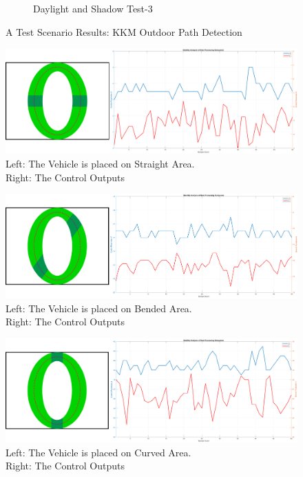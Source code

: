 \documentclass[a4paper,12pt]{article}
\begin{document}
\begin{figure}[H]
\begin{subfigure}{.31\textwidth}
\caption{\label{fig:dataP_outsideObs2} Daylight and Shadow Test-3}

\end{subfigure}

\caption{\label{fig:dataP_outside} A Test Scenario Results: KKM Outdoor Path Detection}

\end{figure}

\begin{figure}[h!]
	\includegraphics[width=.95\textwidth,center]{images/stabilityTestI}
	\caption{ Left: The Vehicle is placed on Straight Area.\\ Right: The Control Outputs \label{fig:stabilityTestI-dist} }
\end{figure}		

\begin{figure}[h!]
	
	\includegraphics[width=.95\textwidth,center]{images/stabilityTestS}
	
	\caption{ Left: The Vehicle is placed on Bended Area.\\ Right: The Control Outputs \label{fig:stabilityTestS-dist} }
	
\end{figure}	
\begin{figure}[h!]
	
	\includegraphics[width=.95\textwidth,center]{images/stabilityTestU}
	
	\caption{ Left: The Vehicle is placed on Curved Area.\\ Right: The Control Outputs \label{fig:stabilityTestU-dist} }
	
\end{figure}	
\end{document}
